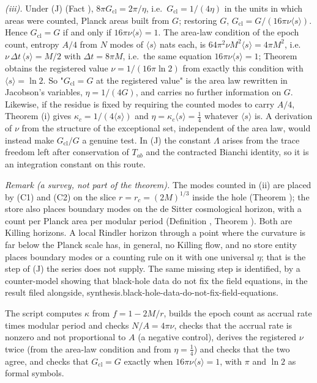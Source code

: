 \emph{(iii).} Under (J) (Fact ), $8\pi G_{\mathrm{cl}} = 2\pi/\eta$, i.e.\ $G_{\mathrm{cl}} = 1/(4\eta)$ in the units in which areas were counted, Planck areas built from $G$; restoring $G$, $G_{\mathrm{cl}} = G/(16\pi\nu\langle s\rangle)$. Hence $G_{\mathrm{cl}} = G$ if and only if $16\pi\nu\langle s\rangle = 1$. The area-law condition of the epoch count, entropy $A/4$ from $N$ modes of $\langle s\rangle$ nats each, is $64\pi^{2}\nu M^{2}\langle s\rangle = 4\pi M^{2}$, i.e.\ $\nu\,\Delta t\,\langle s\rangle = M/2$ with $\Delta t = 8\pi M$, i.e.\ the same equation $16\pi\nu\langle s\rangle = 1$; Theorem  obtains the registered value $\nu = 1/(16\pi\ln 2)$ from exactly this condition with $\langle s\rangle = \ln 2$. So "$G_{\mathrm{cl}} = G$ at the registered value" is the area law rewritten in Jacobson's variables, $\eta = 1/(4G)$, and carries no further information on $G$. Likewise, if the residue is fixed by requiring the counted modes to carry $A/4$, Theorem (i) gives $\kappa_{c} = 1/(4\langle s\rangle)$ and $\eta = \kappa_{c}\langle s\rangle = \tfrac14$ whatever $\langle s\rangle$ is. A derivation of $\nu$ from the structure of the exceptional set, independent of the area law, would instead make $G_{\mathrm{cl}}/G$ a genuine test. In (J) the constant $\Lambda$ arises from the trace freedom left after conservation of $T_{ab}$ and the contracted Bianchi identity, so it is an integration constant on this route.

\emph{Remark (a survey, not part of the theorem).} The modes counted in (ii) are placed by (C1) and (C2) on the slice $r = r_{c} = (2M)^{1/3}$ inside the hole (Theorem ); the store also places boundary modes on the de Sitter cosmological horizon, with a count per Planck area per modular period (Definition , Theorem ). Both are Killing horizons. A local Rindler horizon through a point where the curvature is far below the Planck scale has, in general, no Killing flow, and no store entity places boundary modes or a counting rule on it with one universal $\eta$; that is the step of (J) the series does not supply. The same missing step is identified, by a counter-model showing that black-hole data do not fix the field equations, in the result filed alongside, synthesis.black-hole-data-do-not-fix-field-equations.

The script computes $\kappa$ from $f = 1 - 2M/r$, builds the epoch count as accrual rate times modular period and checks $N/A = 4\pi\nu$, checks that the accrual rate is nonzero and not proportional to $A$ (a negative control), derives the registered $\nu$ twice (from the area-law condition and from $\eta = \tfrac14$) and checks that the two agree, and checks that $G_{\mathrm{cl}} = G$ exactly when $16\pi\nu\langle s\rangle = 1$, with $\pi$ and $\ln 2$ as formal symbols.
